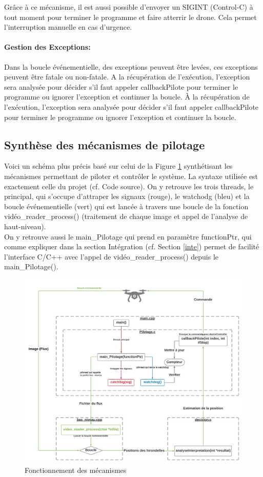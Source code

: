 \documentclass[12pt]{article}
\begin{document}
Grâce à ce mécanisme, il est aussi possible d'envoyer un SIGINT (Control-C) à tout moment pour terminer le programme et faire atterrir le drone. Cela permet l'interruption manuelle en cas d'urgence.

\paragraph*{Gestion des Exceptions:}
Dans la boucle événementielle, des exceptions peuvent être levées, ces exceptions peuvent être fatale ou non-fatale. A la récupération de l'exécution, l'exception sera analysée pour décider s'il faut appeler callbackPilote pour terminer le programme ou ignorer l'exception et continuer la boucle. À la récupération de l'exécution, l'exception sera analysée pour décider s'il faut appeler callbackPilote pour terminer le programme ou ignorer l'exception et continuer la boucle. 

\subsection{Synthèse des mécanismes de pilotage\label{synpilote}}
Voici un schéma plus précis basé sur celui de la Figure \ref{fig:fctprecis} synthétisant les mécanismes permettant de piloter et contrôler le système. La syntaxe utilisée est exactement celle du projet (cf. Code source\cite{git}). On y retrouve les trois threads, le principal, qui s'occupe d'attraper les signaux (rouge), le watchodg (bleu) et la boucle événementielle (vert) qui est lancée à travers une boucle de la fonction vidéo\_reader\_process() (traitement de chaque image et appel de l'analyse de haut-niveau).\\
On y retrouve aussi le main\_Pilotage qui prend en paramètre functionPtr, qui comme expliquer dans la section Intégration (cf. Section \ref{inte}) permet de facilité l'interface C/C++ avec l'appel de vidéo\_reader\_process() depuis le main\_Pilotage().
\begin{figure}[H]
\centering
\includegraphics[width=16cm]{Fonctionnement.png}
\caption{Fonctionnement des mécanismes}
\label{fig:fctprecis}
\end{figure}
\end{document}
